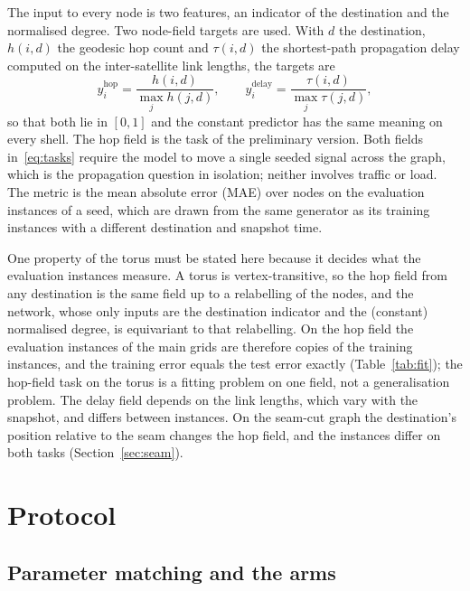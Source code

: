 \documentclass[preprint,11pt,3p]{elsarticle}
\begin{document}
The input to every node is two features, an indicator of the destination and the normalised
degree. Two node-field targets are used. With $d$ the destination, $h(i,d)$ the geodesic hop count
and $\tau(i,d)$ the shortest-path propagation delay computed on the inter-satellite link
lengths, the targets are
\begin{equation}
y^{\mathrm{hop}}_{i} = \frac{h(i,d)}{\max_{j} h(j,d)}, \qquad
y^{\mathrm{delay}}_{i} = \frac{\tau(i,d)}{\max_{j} \tau(j,d)},
\label{eq:tasks}
\end{equation}
so that both lie in $[0,1]$ and the constant predictor has the same meaning on every shell. The
hop field is the task of the preliminary version. Both fields in~\eqref{eq:tasks}
require the model to move a single seeded signal across the graph, which is the propagation
question in isolation; neither involves traffic or load. The metric is the mean absolute
error (MAE) over nodes on the evaluation instances of a seed, which are drawn from the same
generator as its training instances with a different destination and snapshot time.

One property of the torus must be stated here because it decides what the evaluation instances
measure. A torus is vertex-transitive, so the hop field from any destination is the same field up
to a relabelling of the nodes, and the network, whose only inputs are the destination indicator
and the (constant) normalised degree, is equivariant to that relabelling. On the hop field the
evaluation instances of the main grids are therefore copies of the training instances, and the
training error equals the test error exactly (Table~\ref{tab:fit}); the hop-field task on the
torus is a fitting problem on one field, not a generalisation problem. The delay field depends on
the link lengths, which vary with the snapshot, and differs between instances. On the seam-cut
graph the destination's position relative to the seam changes the hop field, and the instances
differ on both tasks (Section~\ref{sec:seam}).

\section{Protocol}
\label{sec:protocol}

\subsection{Parameter matching and the arms}
\end{document}
